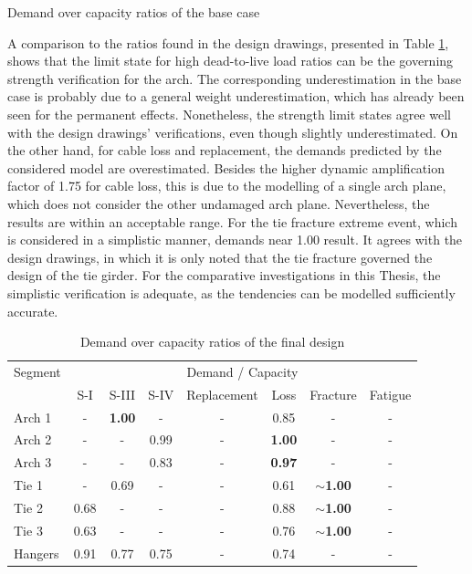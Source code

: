 \begin{table}[H]
    \centering
    \caption{Demand over capacity ratios of the base case}
    \label{tab:dc_base_case}
    
\end{table}

A comparison to the ratios found in the design drawings, presented in Table \ref{tab:dc_drawings}, shows that the limit state for high dead-to-live load ratios can be the governing strength verification for the arch. The corresponding underestimation in the base case is probably due to a general weight underestimation, which has already been seen for the permanent effects. Nonetheless, the strength limit states agree well with the design drawings' verifications, even though slightly underestimated. On the other hand, for cable loss and replacement, the demands predicted by the considered model are overestimated. Besides the higher dynamic amplification factor of 1.75 for cable loss, this is due to the modelling of a single arch plane, which does not consider the other undamaged arch plane. Nevertheless, the results are within an acceptable range. For the tie fracture extreme event, which is considered in a simplistic manner, demands near 1.00 result. It agrees with the design drawings, in which it is only noted that the tie fracture governed the design of the tie girder. For the comparative investigations in this Thesis, the simplistic verification is adequate, as the tendencies can be modelled sufficiently accurate.

\begin{table}[H]
    \centering
    \caption{Demand over capacity ratios of the final design}
    \label{tab:dc_drawings}
    \begin{tabular}{lccccccc}
    \toprule
    Segment & \multicolumn{7}{c}{Demand / Capacity} \\
     & S-I & S-III & S-IV & Replacement & Loss & Fracture & Fatigue\\ \midrule 
    Arch 1 & - & \textbf{1.00} & - & - & 0.85 & -  & - \\ 
    Arch 2 & - & - & 0.99 & - & \textbf{1.00} & -  & - \\ 
    Arch 3 &  - & - & 0.83 & - & \textbf{0.97} & -  & - \\ 
    Tie 1 & - & 0.69 & - & - & 0.61 & $\sim$\textbf{1.00} & - \\ 
    Tie 2 & 0.68 & - & - & - & 0.88 & $\sim$\textbf{1.00} & - \\ 
    Tie 3 & 0.63 & - & - & - & 0.76 & $\sim$\textbf{1.00} & - \\ 
    Hangers & 0.91 & 0.77 & 0.75 & - & 0.74 & -  & -\\ 
    \bottomrule
\end{tabular}

\end{table}

